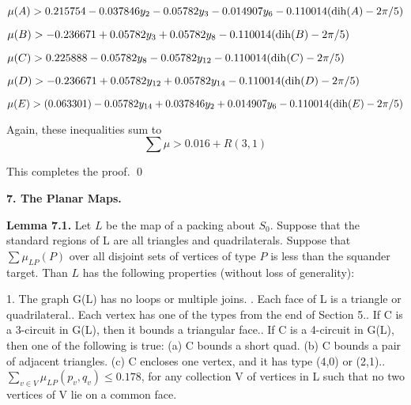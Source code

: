 $\mu(A) >  0.215754 - 0.037846 y_2 -0.05782 y_3 - 0.014907 y_6  - 0.110014 (\operatorname{dih}(A)-2 \pi /5)$\newline

$\mu(B) > - 0.236671 + 0.05782 y_3 + 0.05782 y_8  - 0.110014 (\operatorname{dih}(B)-2 \pi /5) $\newline

$\mu(C) > 0.225888 - 0.05782 y_8 -0.05782 y_{12}- 0.110014 (\operatorname{dih}(C)-2 \pi /5)$
\newline

$\mu(D)> - 0.236671 + 0.05782 y_{12} + 0.05782 y_{14} - 0.110014 (\operatorname{dih}(D)-2 \pi /5)$\newline

$\mu(E) >  (0.063301) - 0.05782 y_{14} + 0.037846 y_2 + 0.014907 y_6 -  0.110014 (\operatorname{dih}(E)-2 \pi /5)$\newline


Again, these inequalities sum to $$\sum\mu > 0.016+R(3,1)$$

This completes the proof. \qed


\bigskip

\centerline{{\bf 7. The Planar Maps.}}
\bigskip

{\bf Lemma 7.1.} Let $L$ be the map of a packing about $S_0$.
Suppose that the standard regions of L are all triangles and quadrilaterals.  
Suppose that $\sum \mu_{LP}(P)$ over all disjoint sets of vertices of type $P$ is less than the squander target.  
Than $L$ has the following properties (without loss of generality): 

1. The graph G(L) has no loops or multiple joins. . Each face of L is a triangle or quadrilateral.. Each vertex has one of the types from the end of Section 5.. If C is a 3-circuit in G(L), then it bounds a triangular face.. If C is a 4-circuit in G(L), then one of the following is true:\newline
(a) C bounds a short quad. \newline
(b) C bounds a pair of adjacent triangles.\newline
(c) C encloses one vertex, and it has type (4,0) or (2,1).. $\sum_{v\in V} \mu_{LP}(p_v,q_v) \leq 0.178$, for any collection V of vertices in L such that no two vertices of V lie on a common face. \newline 


